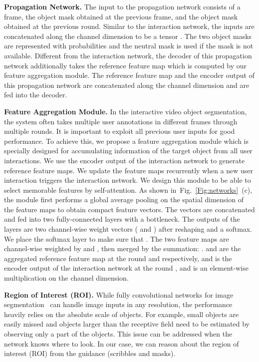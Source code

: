 \documentclass[10pt,twocolumn,letterpaper]{article}
\newcommand{\fref}[1]{Fig.~\ref{#1}}
\renewcommand{\paragraph}[1]{\vspace{1mm}\noindent\textbf{#1}}
\begin{document}
\paragraph{Propagation Network.} 
The input to the propagation network consists of a frame, the object mask obtained at the previous frame, and the object mask obtained at the previous round. 
Similar to the interaction network, the inputs are concatenated along the channel dimension to be a tensor . 
The two object masks are represented with probabilities and the neutral mask is used if the mask is not available. 
Different from the interaction network, the decoder of this propagation network additionally takes the reference feature map which is computed by our feature aggregation module. 
The reference feature map and the encoder output of this propagation network are concatenated along the channel dimension and are fed into the decoder.  

\paragraph{Feature Aggregation Module.}
In the interactive video object segmentation, the system often takes multiple user annotations in different frames through multiple rounds.
It is important to exploit all previous user inputs for good performance.
To achieve this, we propose a feature aggregation module which is specially designed for accumulating information of the target object from all user interactions.
We use the encoder output of the interaction network to generate reference feature maps. We update the feature maps recurrently when a new user interaction triggers the interaction network.
We design this module to be able to select memorable features by self-attention.
As shown in~\fref{Fig:networks}~(c), the module first performs a global average pooling on the spatial dimension of the feature maps to obtain compact feature vectors.
The vectors are concatenated and fed into two fully-connected layers with a bottleneck.
The outputs of the layers are two channel-wise weight vectors ( and ) after reshaping and a softmax.
We place the softmax layer to make sure that .
The two feature maps are channel-wise weighted by  and , then merged by the summation: .
 and  are the aggregated reference feature map at the round  and  respectively, and  is the encoder output of the interaction network at the round , and  is an element-wise multiplication on the channel dimension.

\paragraph{Region of Interest (ROI).}
While fully convolutional networks for image segmentation~\cite{long2015fully} can handle image inputs in any resolution, the performance heavily relies on the absolute scale of objects. 
For example, small objects are easily missed and objects larger than the receptive field need to be estimated by observing only a part of the objects.
This issue can be addressed when the network knows where to look. In our case, we can reason about the region of interest (ROI) from the guidance (\eg scribbles and masks). 
\end{document}
